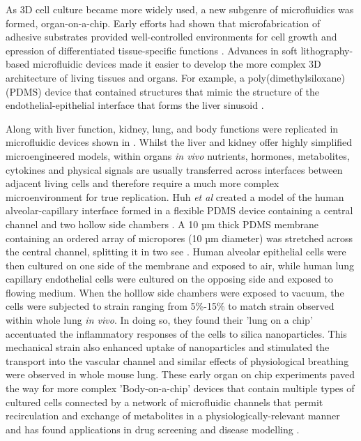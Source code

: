 As 3D cell culture became more widely used, a new subgenre of microfluidics was formed, organ-on-a-chip. Early efforts had shown
that microfabrication of adhesive substrates provided well-controlled environments for cell growth and epression of differentiated tissue-specific functions
\citep{chen1997geometric,bhatia1999effect}. Advances in soft lithography-based microfluidic devices made it easier
to develop the more complex 3D architecture of living tissues and organs. For example, a poly(dimethylsiloxane) (PDMS) device
that contained structures that mimic the structure of the endothelial-epithelial interface that forms the liver sinusoid \citep{nakao2011bile}.

Along with liver function, kidney, lung, and body functions were replicated in microfluidic devices shown in . Whilst the liver and kidney offer highly
simplified microengineered models, within organs \textit{in vivo} nutrients, hormones, metabolites, cytokines and physical signals are usually transferred across interfaces
between adjacent living cells and therefore require a much more complex microenvironment
for true replication. Huh \textit{et al} created a model of the human alveolar-capillary interface formed in a flexible
PDMS device containing a central channel and two hollow side chambers \citep{huh2010reconstituting}. A 10 µm thick PDMS membrane containing an
ordered array of micropores (10 µm diameter) was stretched across the central channel, splitting it in two see .
Human alveolar epithelial cells were then cultured on
one side of the membrane and exposed to air, while human lung capillary endothelial cells were cultured on the opposing side and exposed to flowing
medium. When the holllow side chambers were exposed to vacuum, the cells were subjected to strain ranging from 5\%-15\% to match strain observed within
whole lung \textit{in vivo}. In doing so, they found their 'lung on a chip' accentuated the inflammatory responses of the cells to silica
nanoparticles. This mechanical strain also enhanced uptake of nanoparticles and stimulated the transport into the vascular channel and
similar effects of physiological breathing were observed in whole mouse lung. These early organ on chip experiments paved the way for more complex
'Body-on-a-chip' devices that contain multiple types of cultured cells connected by a network of
microfluidic channels that permit recirculation and exchange of metabolites in a physiologically-relevant manner \citep{esch2011role} and
has found applications in drug screening and disease modelling \citep{skardal2016organoid}.


